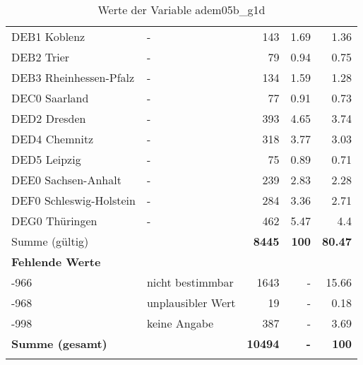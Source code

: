 \begin{longtable}{Xlrrr}
        \multicolumn{1}{X}{DEB1 Koblenz} & - & \num{143} & \num[round-mode=places,round-precision=2]{1.69} & \num[round-mode=places,round-precision=2]{1.36} \\
        \multicolumn{1}{X}{DEB2 Trier} & - & \num{79} & \num[round-mode=places,round-precision=2]{0.94} & \num[round-mode=places,round-precision=2]{0.75} \\
        \multicolumn{1}{X}{DEB3 Rheinhessen-Pfalz} & - & \num{134} & \num[round-mode=places,round-precision=2]{1.59} & \num[round-mode=places,round-precision=2]{1.28} \\
        \multicolumn{1}{X}{DEC0 Saarland} & - & \num{77} & \num[round-mode=places,round-precision=2]{0.91} & \num[round-mode=places,round-precision=2]{0.73} \\
        \multicolumn{1}{X}{DED2 Dresden} & - & \num{393} & \num[round-mode=places,round-precision=2]{4.65} & \num[round-mode=places,round-precision=2]{3.74} \\
        \multicolumn{1}{X}{DED4 Chemnitz} & - & \num{318} & \num[round-mode=places,round-precision=2]{3.77} & \num[round-mode=places,round-precision=2]{3.03} \\
        \multicolumn{1}{X}{DED5 Leipzig} & - & \num{75} & \num[round-mode=places,round-precision=2]{0.89} & \num[round-mode=places,round-precision=2]{0.71} \\
        \multicolumn{1}{X}{DEE0 Sachsen-Anhalt} & - & \num{239} & \num[round-mode=places,round-precision=2]{2.83} & \num[round-mode=places,round-precision=2]{2.28} \\
        \multicolumn{1}{X}{DEF0 Schleswig-Holstein} & - & \num{284} & \num[round-mode=places,round-precision=2]{3.36} & \num[round-mode=places,round-precision=2]{2.71} \\
        \multicolumn{1}{X}{DEG0 Thüringen} & - & \num{462} & \num[round-mode=places,round-precision=2]{5.47} & \num[round-mode=places,round-precision=2]{4.4} \\
     \midrule
      \multicolumn{2}{l}{Summe (gültig)} & \textbf{\num{8445}} &
      \textbf{\num{100}} &
         \textbf{\num[round-mode=places,round-precision=2]{80.47}} \\
     \multicolumn{5}{l}{\textbf{Fehlende Werte}}\\
       -966 & nicht bestimmbar & \num{1643} & - & \num[round-mode=places,round-precision=2]{15.66} \\

       -968 & unplausibler Wert & \num{19} & - & \num[round-mode=places,round-precision=2]{0.18} \\

       -998 & keine Angabe & \num{387} & - & \num[round-mode=places,round-precision=2]{3.69} \\

     \midrule
     \multicolumn{2}{l}{\textbf{Summe (gesamt)}} & \textbf{\num{10494}} & \textbf{-} & \textbf{\num{100}} \\
     \bottomrule
     \caption{Werte der Variable adem05b\_g1d}
     \end{longtable}
     

